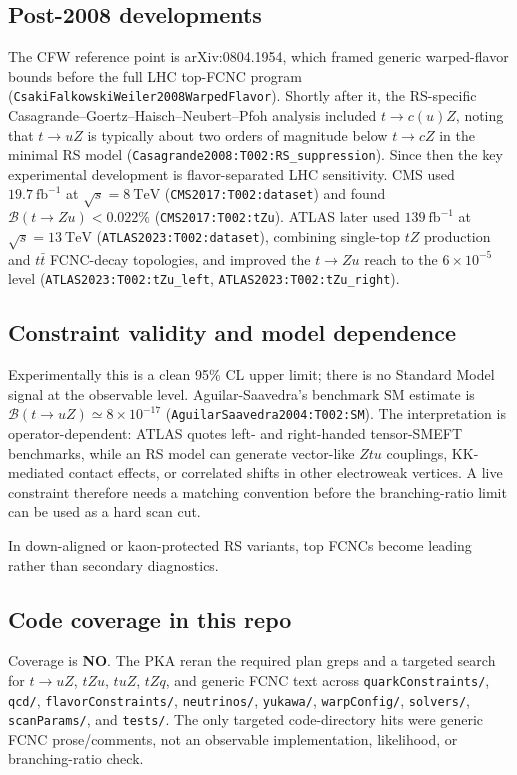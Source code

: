 \subsection*{Post-2008 developments}
The CFW reference point is arXiv:0804.1954, which framed generic
warped-flavor bounds before the full LHC top-FCNC program
(\texttt{CsakiFalkowskiWeiler2008WarpedFlavor}).  Shortly after it, the
RS-specific Casagrande--Goertz--Haisch--Neubert--Pfoh analysis included
\(t\to c(u)Z\), noting that \(t\to uZ\) is typically about two orders of
magnitude below \(t\to cZ\) in the minimal RS model
(\texttt{Casagrande2008:T002:RS\_suppression}).  Since then the key
experimental development is flavor-separated LHC sensitivity.  CMS used
\(19.7~\mathrm{fb}^{-1}\) at \(\sqrt{s}=8~\mathrm{TeV}\)
(\texttt{CMS2017:T002:dataset}) and found
\(\mathcal{B}(t\to Zu)<0.022\%\) (\texttt{CMS2017:T002:tZu}).  ATLAS later
used \(139~\mathrm{fb}^{-1}\) at \(\sqrt{s}=13~\mathrm{TeV}\)
(\texttt{ATLAS2023:T002:dataset}), combining single-top \(tZ\) production and
\(t\bar t\) FCNC-decay topologies, and improved the \(t\to Zu\) reach to the
\(6\times10^{-5}\) level (\texttt{ATLAS2023:T002:tZu\_left},
\texttt{ATLAS2023:T002:tZu\_right}).

\subsection*{Constraint validity and model dependence}
Experimentally this is a clean 95\% CL upper limit; there is no Standard Model
signal at the observable level.  Aguilar-Saavedra's benchmark SM estimate is
\(\mathcal{B}(t\to uZ)\simeq 8\times10^{-17}\)
(\texttt{AguilarSaavedra2004:T002:SM}).  The interpretation is
operator-dependent: ATLAS quotes left- and right-handed tensor-SMEFT
benchmarks, while an RS model can generate vector-like \(Ztu\) couplings,
KK-mediated contact effects, or correlated shifts in other electroweak
vertices.  A live constraint therefore needs a matching convention before the
branching-ratio limit can be used as a hard scan cut.

In down-aligned or kaon-protected RS variants, top FCNCs become leading rather
than secondary diagnostics.

\subsection*{Code coverage in this repo}
Coverage is \textbf{NO}.  The PKA reran the required plan greps and a targeted
search for \(t\to uZ\), \(tZu\), \(tuZ\), \(tZq\), and generic FCNC text across
\texttt{quarkConstraints/}, \texttt{qcd/}, \texttt{flavorConstraints/},
\texttt{neutrinos/}, \texttt{yukawa/}, \texttt{warpConfig/},
\texttt{solvers/}, \texttt{scanParams/}, and \texttt{tests/}.  The only
targeted code-directory hits were generic FCNC prose/comments, not an
observable implementation, likelihood, or branching-ratio check.

